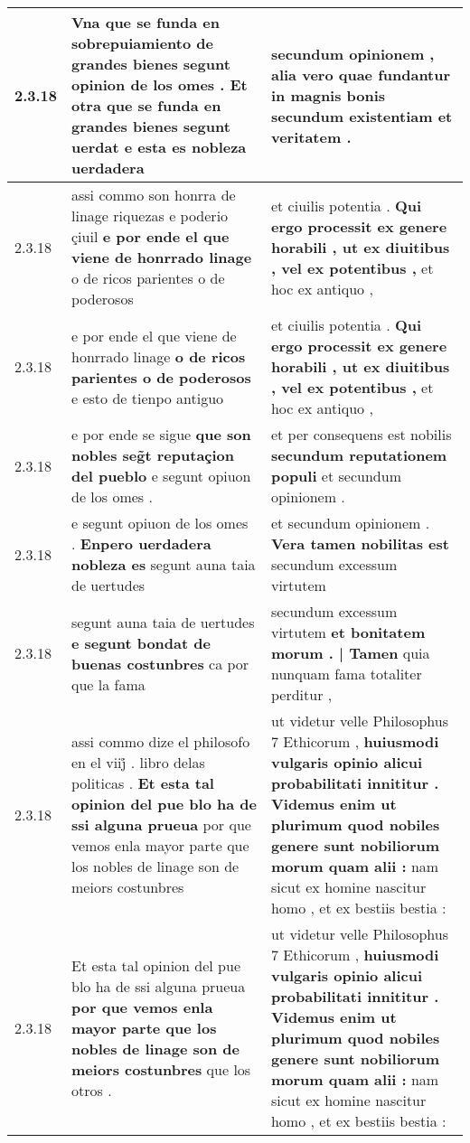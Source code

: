 \begin{tabular}{|p{1cm}|p{6.5cm}|p{6.5cm}|}
2.3.18 & Vna que se funda en sobrepuiamiento de grandes bienes segunt opinion de los omes . \textbf{ Et otra que se funda en grandes bienes segunt uerdat } e esta es nobleza uerdadera & secundum opinionem , \textbf{ alia vero quae fundantur in magnis bonis } secundum existentiam et veritatem . \\\hline
2.3.18 & assi commo son honrra de linage riquezas e poderio çiuil \textbf{ e por ende el que viene de honrrado linage } o de ricos parientes o de poderosos & et ciuilis potentia . \textbf{ Qui ergo processit ex genere horabili , ut ex diuitibus , vel ex potentibus , } et hoc ex antiquo , \\\hline
2.3.18 & e por ende el que viene de honrrado linage \textbf{ o de ricos parientes o de poderosos } e esto de tienpo antiguo & et ciuilis potentia . \textbf{ Qui ergo processit ex genere horabili , ut ex diuitibus , vel ex potentibus , } et hoc ex antiquo , \\\hline
2.3.18 & e por ende se sigue \textbf{ que son nobles seg̃t reputaçion del pueblo } e segunt opiuon de los omes . & et per consequens est nobilis \textbf{ secundum reputationem populi } et secundum opinionem . \\\hline
2.3.18 & e segunt opiuon de los omes . \textbf{ Enpero uerdadera nobleza es } segunt auna taia de uertudes & et secundum opinionem . \textbf{ Vera tamen nobilitas est } secundum excessum virtutem \\\hline
2.3.18 & segunt auna taia de uertudes \textbf{ e segunt bondat de buenas costunbres } ca por que la fama & secundum excessum virtutem \textbf{ et bonitatem morum . | Tamen } quia nunquam fama totaliter perditur , \\\hline
2.3.18 & assi commo dize el philosofo en el viij̊ . libro delas politicas . \textbf{ Et esta tal opinion del pue blo ha de ssi alguna prueua } por que vemos enla mayor parte que los nobles de linage son de meiors costunbres & ut videtur velle Philosophus 7 Ethicorum , \textbf{ huiusmodi vulgaris opinio alicui probabilitati innititur . Videmus enim ut plurimum quod nobiles genere sunt nobiliorum morum quam alii : } nam sicut ex homine nascitur homo , et ex bestiis bestia : \\\hline
2.3.18 & Et esta tal opinion del pue blo ha de ssi alguna prueua \textbf{ por que vemos enla mayor parte que los nobles de linage son de meiors costunbres } que los otros . & ut videtur velle Philosophus 7 Ethicorum , \textbf{ huiusmodi vulgaris opinio alicui probabilitati innititur . Videmus enim ut plurimum quod nobiles genere sunt nobiliorum morum quam alii : } nam sicut ex homine nascitur homo , et ex bestiis bestia : \\\hline

\end{tabular}
